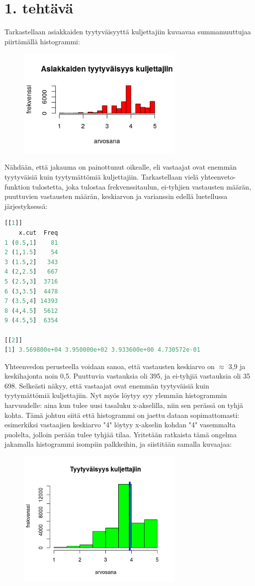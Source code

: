 \documentclass[a4paper]{article}
\begin{document}
\section*{1. tehtävä}
Tarkastellaan asiakkaiden tyytyväisyyttä kuljettajiin kuvaavaa summamuuttujaa piirtämällä histogrammi: \\
\begin{figure}[H]
\includegraphics[width=8cm]{asty_kulj_2017_viimeinen.png}
\end{figure}
Nähdään, että jakauma on painottunut oikealle, eli vastaajat ovat enemmän tyytyväisiä kuin tyytymättömiä kuljettajiin.  
Tarkastellaan vielä yhteenveto-funktion tulostetta, joka tulostaa
frekvenssitaulun, ei-tyhjien vastausten määrän, puuttuvien vastausten määrän, keskiarvon ja varianssin edellä luetellussa järjestyksessä:  \\
\begin{lstlisting}[language=R]
[[1]]
    x.cut  Freq
1 (0.5,1]    81
2 (1,1.5]    54
3 (1.5,2]   343
4 (2,2.5]   667
5 (2.5,3]  3716
6 (3,3.5]  4478
7 (3.5,4] 14393
8 (4,4.5]  5612
9 (4.5,5]  6354

[[2]]
[1] 3.569800e+04 3.950000e+02 3.933600e+00 4.730572e-01
\end{lstlisting}
Yhteenvedon perusteella voidaan sanoa, että vastausten keskiarvo on \(\approx\) 3,9 ja keskihajonta noin 0,5. Puuttuvia vastauksia oli 395, ja ei-tyhjiä vastauksia oli 35 698. Selkeästi näkyy, että vastaajat ovat enemmän tyytyväisiä kuin tyytymättömiä kuljettajiin.
Nyt myös löytyy syy ylemmän histogrammin harvuudelle: aina kun tulee uusi tasaluku x-akselilla, niin sen perässä on tyhjä kohta. Tämä johtuu siitä että histogrammi on jaettu dataan sopimattomasti: esimerkiksi vastaajien keskiarvo "4" löytyy x-akselin kohdan "4" vasemmalta puolelta, jolloin perään tulee tyhjää tilaa. Yritetään ratkaista tämä ongelma jakamalla histogrammi isompiin palkkeihin, ja siistitään samalla kuvaajaa: \\ 
\begin{figure}[H]
\includegraphics[width=8cm]{210517_tyytyv_kulj.png}
\end{figure}
\end{document}

